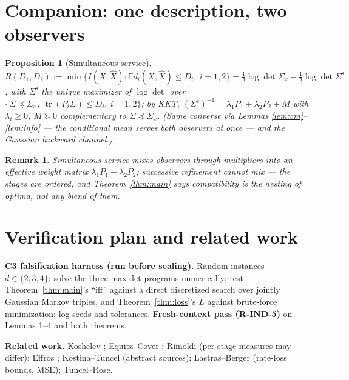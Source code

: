 \documentclass[11pt]{article}
\newtheorem{proposition}{Proposition}\newtheorem{corollary}{Corollary}
\newtheorem{remark}{Remark}\newtheorem{example}{Example}
\newcommand{\E}{\mathbb{E}}\newcommand{\tr}{\operatorname{tr}}
\begin{document}
\section{Companion: one description, two observers}
\begin{proposition}[Simultaneous service]\label{prop:sim}
$R(D_1,D_2):=\min\{I(X;\hat X):\E d_i(X,\hat X)\le D_i,\ i=1,2\}
=\tfrac12\log\det\Sigma_x-\tfrac12\log\det\Sigma^{\mathrm s}$, with
$\Sigma^{\mathrm s}$ the unique maximizer of $\log\det$ over
$\{\Sigma\preceq\Sigma_x,\ \tr(P_i\Sigma)\le D_i,\ i=1,2\}$; by KKT,
$(\Sigma^{\mathrm s})^{-1}=\lambda_1P_1+\lambda_2P_2+M$ with
$\lambda_i\ge0$, $M\succeq0$ complementary to $\Sigma\preceq\Sigma_x$.
(Same converse via Lemmas \ref{lem:cm}--\ref{lem:info} --- the conditional
mean serves both observers at once --- and the Gaussian backward channel.)
\end{proposition}
\begin{remark}
Simultaneous service mixes observers through multipliers into an effective
weight matrix $\lambda_1P_1+\lambda_2P_2$; successive refinement cannot mix
--- the stages are ordered, and Theorem~\ref{thm:main} says compatibility is
the nesting of optima, not any blend of them.
\end{remark}

\section{Verification plan and related work}
\textbf{C3 falsification harness (run before sealing).} Random instances
$d\in\{2,3,4\}$: solve the three max-det programs numerically; test
Theorem~\ref{thm:main}'s ``iff'' against a direct discretized search over
jointly Gaussian Markov triples, and Theorem~\ref{thm:loss}'s $L$ against
brute-force minimization; log seeds and tolerances. \textbf{Fresh-context
pass (R-IND-5)} on Lemmas 1--4 and both theorems.

\textbf{Related work.} Koshelev \cite{koshelev}; Equitz--Cover
\cite{equitzcover}; Rimoldi \cite{rimoldi} (per-stage measures may differ);
Effros \cite{effros}; Kostina--Tuncel \cite{kostinatuncel} (abstract
sources); Lastras--Berger (rate-loss bounds, MSE); Tuncel--Rose.
\end{document}
